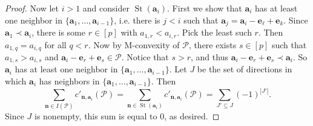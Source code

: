 \documentclass[10pt,a4paper]{amsart}
\DeclareMathOperator{\St}{St}
\newcommand{\bfa}{\mathbf{a}}
\newcommand{\bfe}{\mathbf{e}}
\newcommand{\bfn}{\mathbf{n}}
\newcommand{\sP}{\mathscr{P}}
\begin{document}
\begin{proof}
Now let $i>1$ and consider $\St(\bfa_i)$. First we show that $\bfa_i$ has at least one neighbor in $\{\bfa_1, \ldots, \bfa_{i-1}\}$, i.e. there is $j<i$ such that $\bfa_j = \bfa_i - \bfe_{\ell}+\bfe_k$. Since $\bfa_1 \prec \bfa_i$, there is some $r \in [p]$ with $a_{1,r} < a_{i,r}$. Pick the least such $r$. Then $a_{1,q} = a_{i,q}$ for all $q < r$. Now by M-convexity of $\sP$, there exists $s \in [p]$ such that $a_{1,s} > a_{i,s}$ and $\bfa_i - \bfe_r + \bfe_s \in \sP$. Notice that $s > r$, and thus $\bfa_i-\bfe_r+\bfe_s \prec \bfa_i$. So $\bfa_i$ has at least one neighbor in $\{\bfa_1, \ldots, \bfa_{i-1}\}$. Let $J$ be the set of directions in which $\bfa_i$ has neighbors in $\{\bfa_1, \ldots, \bfa_{i-1}\}$. Then 
\[\sum_{\bfn \in I(\sP)} c'_{\bfn, \bfa_i}(\sP) = \sum_{\bfn \in \St(\bfa_i)} c'_{\bfn, \bfa_i}(\sP) = \sum_{J' \subseteq J} (-1)^{|J'|}.\]
Since $J$ is nonempty, this sum is equal to 0, as desired. 

\end{proof}
\end{document}
